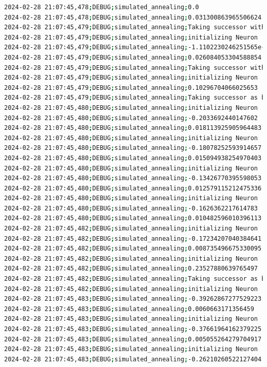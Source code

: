 \documentclass{article}
\begin{document}
\begin{lstlisting}[language=bash, caption=Example Output of Program]
2024-02-28 21:07:45,478;DEBUG;simulated_annealing;0.0
2024-02-28 21:07:45,478;DEBUG;simulated_annealing;0.031300863965506624
2024-02-28 21:07:45,479;DEBUG;simulated_annealing;Taking successor with probability 100% (exploration)
2024-02-28 21:07:45,479;DEBUG;simulated_annealing;initializing Neuron
2024-02-28 21:07:45,479;DEBUG;simulated_annealing;-1.1102230246251565e-16
2024-02-28 21:07:45,479;DEBUG;simulated_annealing;0.026084053304588854
2024-02-28 21:07:45,479;DEBUG;simulated_annealing;Taking successor with probability 99% (exploration)
2024-02-28 21:07:45,479;DEBUG;simulated_annealing;initializing Neuron
2024-02-28 21:07:45,479;DEBUG;simulated_annealing;0.10296704066025653
2024-02-28 21:07:45,479;DEBUG;simulated_annealing;Taking successor as better option (exploitation)
2024-02-28 21:07:45,480;DEBUG;simulated_annealing;initializing Neuron
2024-02-28 21:07:45,480;DEBUG;simulated_annealing;-0.2033692440147602
2024-02-28 21:07:45,480;DEBUG;simulated_annealing;0.018113925905964483
2024-02-28 21:07:45,480;DEBUG;simulated_annealing;initializing Neuron
2024-02-28 21:07:45,480;DEBUG;simulated_annealing;-0.18078252593914657
2024-02-28 21:07:45,480;DEBUG;simulated_annealing;0.015094938254970403
2024-02-28 21:07:45,480;DEBUG;simulated_annealing;initializing Neuron
2024-02-28 21:07:45,480;DEBUG;simulated_annealing;-0.13426770395598053
2024-02-28 21:07:45,480;DEBUG;simulated_annealing;0.012579115212475336
2024-02-28 21:07:45,480;DEBUG;simulated_annealing;initializing Neuron
2024-02-28 21:07:45,480;DEBUG;simulated_annealing;-0.1626362217614783
2024-02-28 21:07:45,480;DEBUG;simulated_annealing;0.010482596010396113
2024-02-28 21:07:45,482;DEBUG;simulated_annealing;initializing Neuron
2024-02-28 21:07:45,482;DEBUG;simulated_annealing;-0.17234207040384641
2024-02-28 21:07:45,482;DEBUG;simulated_annealing;0.008735496675330095
2024-02-28 21:07:45,482;DEBUG;simulated_annealing;initializing Neuron
2024-02-28 21:07:45,482;DEBUG;simulated_annealing;0.23527880639765497
2024-02-28 21:07:45,482;DEBUG;simulated_annealing;Taking successor as better option (exploitation)
2024-02-28 21:07:45,482;DEBUG;simulated_annealing;initializing Neuron
2024-02-28 21:07:45,483;DEBUG;simulated_annealing;-0.39262867277529223
2024-02-28 21:07:45,483;DEBUG;simulated_annealing;0.0060663171356459
2024-02-28 21:07:45,483;DEBUG;simulated_annealing;initializing Neuron
2024-02-28 21:07:45,483;DEBUG;simulated_annealing;-0.37661964162379225
2024-02-28 21:07:45,483;DEBUG;simulated_annealing;0.005055264279704917
2024-02-28 21:07:45,483;DEBUG;simulated_annealing;initializing Neuron
2024-02-28 21:07:45,483;DEBUG;simulated_annealing;-0.26210260522127404

\end{lstlisting}
\end{document}
